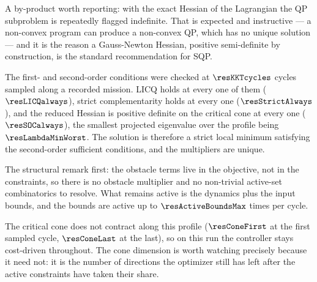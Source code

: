 A by-product worth reporting: with the exact Hessian of the Lagrangian the QP subproblem is repeatedly flagged indefinite. That is expected and instructive --- a non-convex program can produce a non-convex QP, which has no unique solution --- and it is the reason a Gauss-Newton Hessian, positive semi-definite by construction, is the standard recommendation for SQP.


\begin{table}[htbp]
  \centering
  \small
  \caption{The same instance solved by a primal--dual interior-point method and by an SQP with an active-set QP solver, in both obstacle regimes. Both are started cold. Bold: the faster of the two.}
  \label{res:tab:solvercmp}
\end{table}

\label{res:kkt}


The first- and second-order conditions were checked at $\resKKTcycles$ cycles sampled along a recorded mission. LICQ holds at every one of them ($\resLICQalways$), strict complementarity holds at every one ($\resStrictAlways$), and the reduced Hessian is positive definite on the critical cone at every one ($\resSOCalways$), the smallest projected eigenvalue over the profile being $\resLambdaMinWorst$. The solution is therefore a strict local minimum satisfying the second-order sufficient conditions, and the multipliers are unique.

The structural remark first: the obstacle terms live in the objective, not in the constraints, so there is no obstacle multiplier and no non-trivial active-set combinatorics to resolve. What remains active is the dynamics plus the input bounds, and the bounds are active up to $\resActiveBoundsMax$ times per cycle.

The critical cone does not contract along this profile ($\resConeFirst$ at the first sampled cycle, $\resConeLast$ at the last), so on this run the controller stays cost-driven throughout. The cone dimension is worth watching precisely because it need not: it is the number of directions the optimizer still has left after the active constraints have taken their share.


